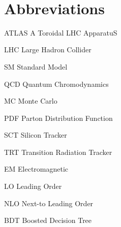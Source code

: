 \abbreviations\ 


\section*{Abbreviations}

\begin{symbollist}
    \item[ATLAS] A Toroidal LHC ApparatuS
    \item[LHC] Large Hadron Collider
    \item[SM] Standard Model
    \item[QCD] Quantum Chromodynamics
    \item[MC] Monte Carlo
    \item[PDF] Parton Distribution Function
    \item[SCT] Silicon Tracker
    \item[TRT] Transition Radiation Tracker
    \item[EM] Electromagnetic
    \item[LO] Leading Order
    \item[NLO] Next-to Leading Order
    \item[BDT] Boosted Decision Tree
\end{symbollist}
